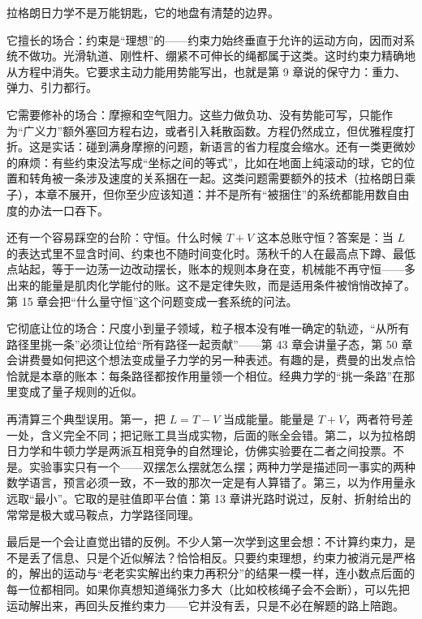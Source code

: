 \begin{mainline}
拉格朗日力学不是万能钥匙，它的地盘有清楚的边界。

它擅长的场合：约束是“理想”的——约束力始终垂直于允许的运动方向，因而对系统不做功。光滑轨道、刚性杆、绷紧不可伸长的绳都属于这类。这时约束力精确地从方程中消失。它要求主动力能用势能写出，也就是第 9 章说的保守力：重力、弹力、引力都行。

它需要修补的场合：摩擦和空气阻力。这些力做负功、没有势能可写，只能作为“广义力”额外塞回方程右边，或者引入耗散函数。方程仍然成立，但优雅程度打折。这是实话：碰到满身摩擦的问题，新语言的省力程度会缩水。还有一类更微妙的麻烦：有些约束没法写成“坐标之间的等式”，比如在地面上纯滚动的球，它的位置和转角被一条涉及速度的关系捆在一起。这类问题需要额外的技术（拉格朗日乘子），本章不展开，但你至少应该知道：并不是所有“被捆住”的系统都能用数自由度的办法一口吞下。

还有一个容易踩空的台阶：守恒。什么时候 \(T+V\) 这本总账守恒？答案是：当 \(L\) 的表达式里不显含时间、约束也不随时间变化时。荡秋千的人在最高点下蹲、最低点站起，等于一边荡一边改动摆长，账本的规则本身在变，机械能不再守恒——多出来的能量是肌肉化学能付的账。这不是定律失败，而是适用条件被悄悄改掉了。第 15 章会把“什么量守恒”这个问题变成一套系统的问法。

它彻底让位的场合：尺度小到量子领域，粒子根本没有唯一确定的轨迹，“从所有路径里挑一条”必须让位给“所有路径一起贡献”——第 43 章会讲量子态，第 50 章会讲费曼如何把这个想法变成量子力学的另一种表述。有趣的是，费曼的出发点恰恰就是本章的账本：每条路径都按作用量领一个相位。经典力学的“挑一条路”在那里变成了量子规则的近似。

再清算三个典型误用。第一，把 \(L=T-V\) 当成能量。能量是 \(T+V\)，两者符号差一处，含义完全不同；把记账工具当成实物，后面的账全会错。第二，以为拉格朗日力学和牛顿力学是两派互相竞争的自然理论，仿佛实验要在二者之间投票。不是。实验事实只有一个——双摆怎么摆就怎么摆；两种力学是描述同一事实的两种数学语言，预言必须一致，不一致的那次一定是有人算错了。第三，以为作用量永远取“最小”。它取的是驻值即平台值：第 13 章讲光路时说过，反射、折射给出的常常是极大或马鞍点，力学路径同理。

最后是一个会让直觉出错的反例。不少人第一次学到这里会想：不计算约束力，是不是丢了信息、只是个近似解法？恰恰相反。只要约束理想，约束力被消元是严格的，解出的运动与“老老实实解出约束力再积分”的结果一模一样，连小数点后面的每一位都相同。如果你真想知道绳张力多大（比如校核绳子会不会断），可以先把运动解出来，再回头反推约束力——它并没有丢，只是不必在解题的路上陪跑。
\end{mainline}

